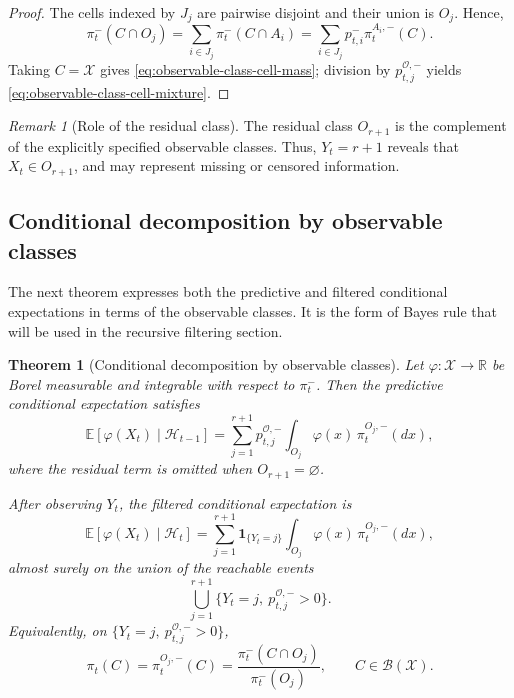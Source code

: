 \documentclass[10pt,twocolumn]{article}
\newtheorem{theorem}{Theorem}
\theoremstyle{remark}
\newtheorem{remark}{Remark}
\newcommand{\R}{\mathbb{R}}
\newcommand{\E}{\mathbb{E}}
\newcommand{\B}{\mathcal{B}}
\newcommand{\Hh}{\mathcal{H}}
\newcommand{\Oo}{\mathcal{O}}
\newcommand{\Xcal}{\mathcal{X}}
\newcommand{\one}{\mathbf{1}}
\begin{document}
\begin{proof}
	The cells indexed by $J_j$ are pairwise disjoint and their union is $O_j$. Hence,
	\[
	\pi_t^{-}(C\cap O_j)
	=
	\sum_{i\in J_j}\pi_t^{-}(C\cap A_i)
	=
	\sum_{i\in J_j}p_{t,i}^{-}\pi_t^{A_i,-}(C).
	\]
	Taking $C=\Xcal$ gives \cref{eq:observable-class-cell-mass}; division by $p_{t,j}^{\Oo,-}$ yields \cref{eq:observable-class-cell-mixture}.
\end{proof}

\begin{remark}[Role of the residual class]
	\label{rem:role-residual-class}
	The residual class $O_{r+1}$ is the complement of the explicitly specified observable classes. 
	Thus, $Y_t=r+1$ reveals that $X_t\in O_{r+1}$, and may represent missing or censored information.
\end{remark}

\subsection{Conditional decomposition by observable classes}
\label{subsec:conditional-decomposition}

The next theorem expresses both the predictive and filtered conditional expectations in terms of the observable classes. It is the form of Bayes rule that will be used in the recursive filtering section.

\begin{theorem}[Conditional decomposition by observable classes]
	\label{thm:observable-class-decomposition}
	Let $\varphi:\Xcal\to\R$ be Borel measurable and integrable with respect to $\pi_t^{-}$. Then the predictive conditional expectation satisfies
	\begin{equation}
		\E[\varphi(X_t)\mid\Hh_{t-1}]
		=
		\sum_{j=1}^{r+1}p_{t,j}^{\Oo,-}
		\int_{O_j}\varphi(x)\,\pi_t^{O_j,-}(dx),
		\label{eq:predictive-observable-decomposition}
	\end{equation}
	where the residual term is omitted when $O_{r+1}=\varnothing$.
	
	After observing $Y_t$, the filtered conditional expectation is
	\begin{equation}
		\E[\varphi(X_t)\mid\Hh_t]
		=
		\sum_{j=1}^{r+1}
		\one_{\{Y_t=j\}}
		\int_{O_j}\varphi(x)\,\pi_t^{O_j,-}(dx),
		\label{eq:filtered-observable-decomposition}
	\end{equation}
	almost surely on the union of the reachable events
	\[
	\bigcup_{j=1}^{r+1}
	\bigl\{Y_t=j,\ p_{t,j}^{\Oo,-}>0\bigr\}.
	\]
	Equivalently, on $\{Y_t=j,\ p_{t,j}^{\Oo,-}>0\}$,
	\begin{equation}
		\pi_t(C)
		=
		\pi_t^{O_j,-}(C)
		=
		\frac{\pi_t^{-}(C\cap O_j)}{\pi_t^{-}(O_j)},
		\qquad C\in\B(\Xcal).
		\label{eq:static-bayes-observable-class}
	\end{equation}
\end{theorem}
\end{document}
